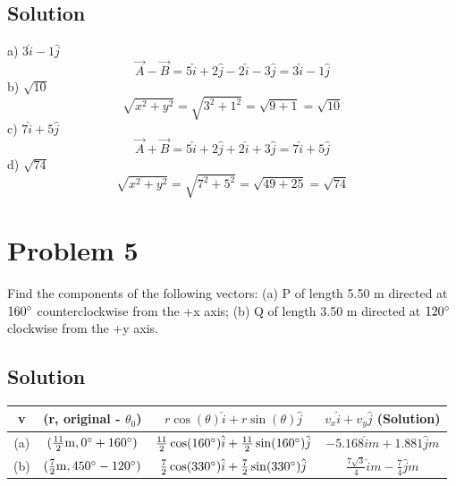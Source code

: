 \documentclass[12pt]{article}
\begin{document}
\subsection*{Solution}

a) $3\hat{i} - 1\hat{j}$
\begin{equation*}
    \Vec{A} - \Vec{B} = 5\hat{i} + 2\hat{j} - 2\hat{i} - 3\hat{j} = 3\hat{i} - 1\hat{j}
\end{equation*}
b) $\sqrt{10}$
\begin{equation*}
    \sqrt{x^2+y^2} = \sqrt{3^2+1^2} = \sqrt{9+1} = \sqrt{10}
\end{equation*}
c) $7\hat{i} + 5\hat{j}$
\begin{equation*}
    \Vec{A} + \Vec{B} = 5\hat{i} + 2\hat{j} + 2\hat{i} + 3\hat{j} = 7\hat{i} + 5\hat{j}
\end{equation*}
d) $\sqrt{74}$
\begin{equation*}
    \sqrt{x^2+y^2} = \sqrt{7^2+5^2} = \sqrt{49+25} = \sqrt{74}
\end{equation*}


\pagebreak
\section*{Problem 5}
Find the components of the following vectors: (a) P of length 5.50 m directed at $160\degree$ counterclockwise from the +x axis; (b) Q of length 3.50 m directed at $120\degree$ clockwise from the +y axis.

\subsection*{Solution}

\begin{center}
    \begin{tabular}{ c | c | c | c }
        v & (r, original - $\theta_0$) & $r\cos(\theta)\hat{i}+r\sin(\theta)\hat{j}$ & $v_x\hat{i} + v_y\hat{j}$ (Solution)\\ \hline
        (a) & $(\frac{11}{2}\unit{\m},0\degree + 160\degree)$ & $\frac{11}{2}\cos(160\degree)\hat{i} + \frac{11}{2}\sin(160\degree)\hat{j}$ & $-5.168 \hat{i}\unit{m} + 1.881 \hat{j}\unit{m}$\\
        (b) & $(\frac{7}{2}\unit{\m},450\degree - 120\degree)$ & $\frac{7}{2}\cos(330\degree)\hat{i} + \frac{7}{2}\sin(330\degree)\hat{j}$ & $\frac{7\sqrt{3}}{4}\hat{i}\unit{m} - \frac{7}{4}\hat{j}\unit{m}$
    \end{tabular}
\end{center}
\end{document}
